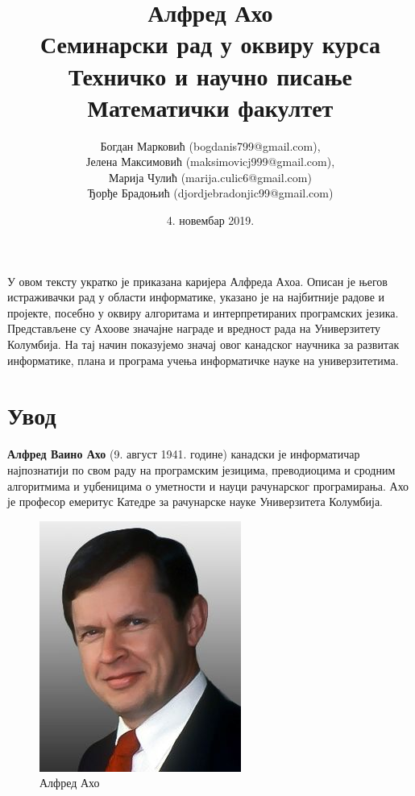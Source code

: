 \documentclass[a4paper]{article}
\begin{document}
\title{Алфред Ахо\\ \small{Семинарски рад у оквиру курса\\Техничко и научно писање\\Математички факултет}}

\author{Богдан Марковић (bogdanis799@gmail.com),\\Јелена Максимовић (maksimovicj999@gmail.com),\\ Марија Чулић (marija.culic6@gmail.com)\\ Ђорђе Брадоњић (djordjebradonjic99@gmail.com)\\}
\date{4. новембар 2019.}
\maketitle

\abstract

У овом тексту укратко је приказана каријера Алфреда Ахоа. Описан је његов истраживачки рад у области информатике, указано је на најбитније радове и пројекте, посебно у оквиру алгоритама и интерпретираних програмских језика. Представљене су Ахоове значајне награде и вредност рада на Универзитету Колумбија. На тај начин показујемо значај овог канадског научника за развитак информатике, плана и програма учења информатичке науке на универзитетима.

\tableofcontents

\newpage

\section{Увод}
\label{sec:uvod}
\textbf{Алфред Ваино Ахо} (9. август 1941. године) канадски је информатичар најпознатији по свом раду на програмским језицима, преводиоцима и сродним алгоритмима и уџбеницима о уметности и науци рачунарског програмирања. Ахо је професор емеритус Катедре за рачунарске науке Универзитета Колумбија.\cite{aav1968}\cite{3}\cite{4}\cite{5}\cite{6}\cite{7}\cite{8}\cite{9}\cite{10}

\begin{figure}[h!]
\begin{center}
\includegraphics[scale=1.75]{AlfredAhoPortrait.jpg}
\end{center}
\caption{Алфред Ахо}
\end{figure}
\end{document}
